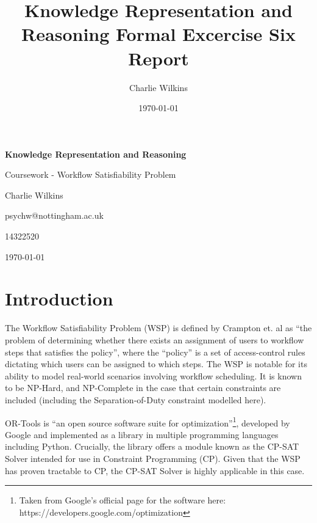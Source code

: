 \documentclass[11pt]{article}
\title{Knowledge Representation and Reasoning Formal Excercise Six Report}
\author{Charlie Wilkins}
\date{\today}
\begin{document}
	\begin{titlepage}
		\begin{center}
			\vspace*{1cm}

       		\textbf{Knowledge Representation and Reasoning}

       		\vspace{0.5cm}

			   Coursework - Workflow Satisfiability Problem

       		\vspace{1.5cm}

       		Charlie Wilkins
			
			\vspace{0.5cm}			
			
       		psychw@nottingham.ac.uk
       		
       		14322520
       		
       		\vspace{0.5cm}
       		
       		\today
		\end{center}
	\end{titlepage}

	\tableofcontents

	\newpage

	\section{Introduction}

		The Workflow Satisfiability Problem (WSP) is defined by Crampton et. al\cite{crampton16} as
		``the problem of determining whether there exists an assignment of
		users to workflow steps that satisfies the policy'', where the ``policy''
		is a set of access-control rules dictating which users can be assigned
		to which steps. The WSP is notable for its ability to model real-world
		scenarios involving workflow scheduling\cite{crampton16}. It is known to be NP-Hard\cite{crampton162}, and NP-Complete in the case that
		certain constraints are included (including the Separation-of-Duty constraint
		modelled here)\cite{wang10}.

		OR-Tools is ``an open source software suite for optimization''\footnote{Taken from Google's official page for the software here: https://developers.google.com/optimization},
		developed by Google and implemented as a library in multiple programming languages including Python.
		Crucially, the library offers a module known as the CP-SAT Solver intended for
		use in Constraint Programming (CP). Given that the WSP has proven tractable to
		CP\cite{benoist02}, the CP-SAT Solver is highly applicable in this case.
\end{document}

